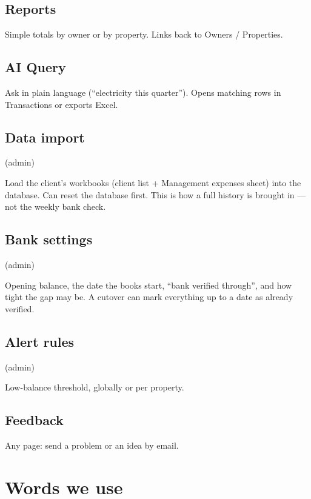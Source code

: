 \documentclass[11pt,a4paper]{article}
\begin{document}
\subsection{Reports}

Simple totals by owner or by property.
Links back to Owners / Properties.

\subsection{AI Query}

Ask in plain language (``electricity this quarter'').
Opens matching rows in Transactions or exports Excel.

\subsection{Data import} (admin)

Load the client's workbooks (client list + Management expenses sheet) into the
database. Can reset the database first.
This is how a full history is brought in --- not the weekly bank check.

\subsection{Bank settings} (admin)

Opening balance, the date the books start, ``bank verified through'',
and how tight the gap may be.
A cutover can mark everything up to a date as already verified.

\subsection{Alert rules} (admin)

Low-balance threshold, globally or per property.

\subsection{Feedback}

Any page: send a problem or an idea by email.

\section{Words we use}
\end{document}
